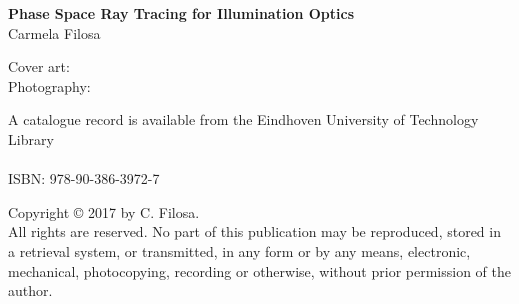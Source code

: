 
\thispagestyle{plain}

\vspace*{4cm}

\begin{center}
{\Huge \textbf{Phase Space Ray Tracing for Illumination Optics}}\\
\vspace{1cm}
{\huge{Carmela Filosa}}
\end{center}



\clearpage
\thispagestyle{plain}

\vspace*{\fill}



\noindent Cover art: \\
Photography: 

\vspace{1cm}

\noindent A catalogue record is available from the Eindhoven University of Technology Library\\
\\
\noindent ISBN: 978-90-386-3972-7\\

\vspace{1cm}

\noindent Copyright \copyright{} 2017 by C. Filosa. \\
All rights are reserved. No part of this publication may be reproduced, stored in a retrieval system, or transmitted, in any form or by any means, electronic, mechanical, photocopying, recording or otherwise, without prior permission of the author.

\clearpage


\thispagestyle{plain}

